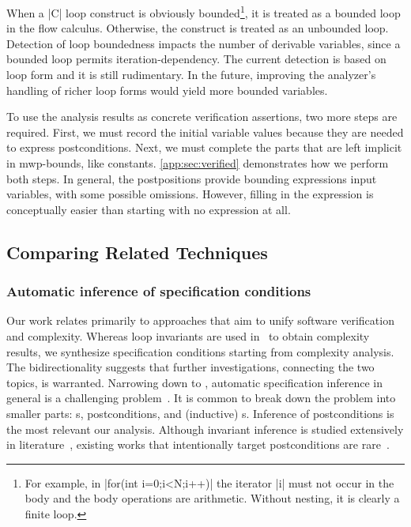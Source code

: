 When a \pr|C| loop construct is obviously bounded\footnote{For example, in \pr|for(int i=0;i<N;i++)| the iterator \pr|i| must not occur in the body and the body operations are arithmetic. Without nesting, it is clearly a finite loop.}, it is treated as a bounded loop in the flow calculus.
Otherwise, the construct is treated as an unbounded loop.
Detection of loop boundedness impacts the number of derivable variables, since a bounded loop permits iteration-dependency.
The current detection is based on loop form and it is still rudimentary.
In the future, improving the analyzer's handling of richer loop forms would yield more bounded variables.

To use the analysis results as concrete verification assertions, two more steps are required.
First, we must record the initial variable values because they are needed to express postconditions.
Next, we must complete the parts that are left implicit in mwp-bounds, like constants.
\autoref{app:sec:verified} demonstrates how we perform both steps.
In general, the postpositions provide bounding expressions \wrt input variables, with some possible omissions.
However, filling in the expression is conceptually easier than starting with no expression at all.

\subsection{Comparing Related Techniques}
\label{sec:related-works}

\subsubsection{Automatic inference of specification conditions}
\label{subsec:automatic-inference}

Our work relates primarily to approaches that aim to unify software verification and complexity.
Whereas loop invariants are used in~\cite{nguyen2017} to obtain complexity results, we synthesize specification conditions starting from complexity analysis.
The bidirectionality suggests that further investigations, connecting the two topics, is warranted.
Narrowing down to , automatic specification inference in general is a challenging problem~\cite{dillig2013,yu2023}.
It is common to break down the problem into smaller parts: s, postconditions, and (inductive) s.
Inference of postconditions is the most relevant \wrt our analysis.
Although invariant inference is studied extensively in literature~\cite{karr1976,cousot1978,colon2003,sankaranarayanan2004,dillig2013,si2018,ryan2020,yao2020,yu2023,nguyen2014,nguyen2017},
existing works that intentionally target postconditions are rare~\cite{popeea2006,molina2021}.

